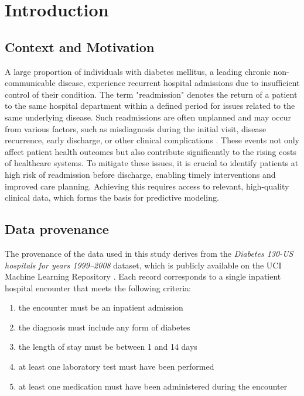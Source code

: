 \section{Introduction}

\subsection{Context and Motivation}
A large proportion of individuals with diabetes mellitus, a leading chronic non-communicable disease, experience recurrent hospital admissions due to insufficient control of their condition. The term "readmission" denotes the return of a patient to the same hospital department within a defined period for issues related to the same underlying disease. Such readmissions are often unplanned and may occur from various factors, such as misdiagnosis during the initial visit, disease recurrence, early discharge, or other clinical complications \cite{dungan2012effect, eby2014predictors}. These events not only affect patient health outcomes but also contribute significantly to the rising costs of healthcare systems. To mitigate these issues, it is crucial to identify patients at high risk of readmission before discharge, enabling timely interventions and improved care planning. Achieving this requires access to relevant, high-quality clinical data, which forms the basis for predictive modeling.


\subsection{Data provenance}
The provenance of the data used in this study derives from the \textit{Diabetes 130-US hospitals for years 1999–2008} dataset, which is publicly available on the UCI Machine Learning Repository \cite{uciml}. Each record corresponds to a single inpatient hospital encounter that meets the following criteria: 
\begin{enumerate}
    \item the encounter must be an inpatient admission
    \item the diagnosis must include any form of diabetes
    \item the length of stay must be between 1 and 14 days
    \item at least one laboratory test must have been performed
    \item at least one medication must have been administered during the encounter
\end{enumerate}

